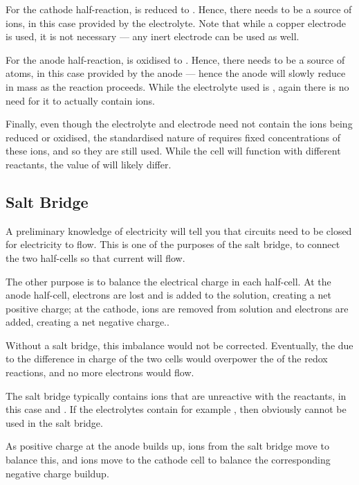 			For the cathode half-reaction,  is reduced to . Hence, there needs to be a source of  ions,
			in this case provided by the  electrolyte. Note that while a copper electrode is used, it is not necessary --- any
			inert electrode can be used as well.

			For the anode half-reaction,  is oxidised to . Hence, there needs to be a source of  atoms,
			in this case provided by the anode --- hence the anode will slowly reduce in mass as the reaction proceeds. While the electrolyte
			used is , again there is no need for it to actually contain  ions.

			Finally, even though the electrolyte and electrode need not contain the ions being reduced or oxidised, the standardised nature of
			\Ecell{} requires fixed concentrations of these ions, and so they are still used. While the cell will function with different
			reactants, the value of \Ecell{} will likely differ.



		\subsection{Salt Bridge}

			A preliminary knowledge of electricity will tell you that circuits need to be closed for electricity to flow. This is one of the
			purposes of the salt bridge, to connect the two half-cells so that current will flow.

			The other purpose is to balance the electrical charge in each half-cell. At the anode half-cell, electrons are lost and
			 is added to the solution, creating a net positive charge; at the cathode,  ions are removed from solution
			and electrons are added, creating a net negative charge..

			Without a salt bridge, this imbalance would not be corrected. Eventually, the  due to the difference in
			charge of the two cells would overpower the \Ecell{} of the redox reactions, and no more electrons would flow.

			The salt bridge typically contains ions that are unreactive with the reactants, in this case  and \ch{\Cl-}. If the
			electrolytes contain for example , then obviously \ch{\Cl-} cannot be used in the salt bridge.

			As positive charge at the anode builds up, \ch{\Cl-} ions from the salt bridge move to balance this, and  ions move to the
			cathode cell to balance the corresponding negative charge buildup.


